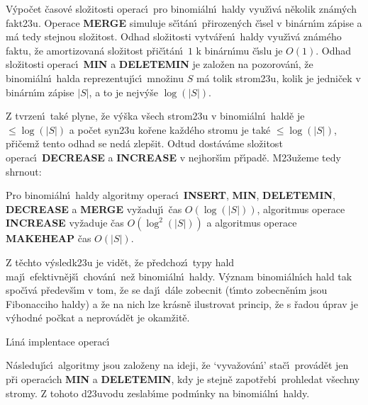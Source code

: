 \documentclass[a4paper,12pt]{article}
\begin{document}
\flushpar V\'ypo\v cet \v casov\'e slo\v zitosti operac\'\i\ pro binomi\'aln\'\i\ haldy 
vyu\v z\'\i v\'a n\v ekolik zn\'am\'ych fakt\accent23u.  Ope\-race {\bf MERGE }
simuluje s\v c\'\i t\'an\'\i\ p\v rirozen\'ych \v c\'\i sel v bin\'arn\'\i m z\'apise a m\'a 
tedy stejnou slo\v zitost.  Odhad slo\v zitosti vytv\'a\v ren\'\i\ haldy vyu\v z\'\i v\'a 
zn\'am\'eho faktu, \v ze amortizovan\'a slo\v zitost p\v ri\v c\'\i t\'an\'\i\ $
1$  
k bin\'arn\'\i mu \v c\'\i slu je $O(1)$.  
Odhad slo\v zitosti operac\'\i\ {\bf MIN} a {\bf DELETEMIN} je zalo\v zen na 
pozorov\'an\'\i , \v ze binomi\'aln\'\i\ halda reprezentuj\'\i c\'\i\ mno\v zinu $
S$ m\'a 
tolik strom\accent23u, kolik je jedni\v cek v bin\'arn\'\i m z\'apise $
|S|$, a 
to je nejv\'y\v se $\log(|S|)$.  
\medskip

\flushpar Z tvrzen\'\i\ tak\'e plyne, \v ze v\'y\v ska v\v sech strom\accent23u v 
binomi\'aln\'\i\ hald\v e je $\le\log(|S|)$ a po\v cet syn\accent23u 
ko\v rene ka\v zd\'eho stromu je 
tak\'e $\le\log(|S|)$, p\v ri\v cem\v z tento odhad se ned\'a zlep\v sit. Odtud 
dost\'av\'ame slo\v zitost operac\'\i\ {\bf DECREASE} a {\bf INCREASE} v nejhor\v s\'\i m 
p\v r\'\i pad\v e. M\accent23u\v zeme tedy shrnout:
\medskip


Pro binomi\'aln\'\i\ haldy algoritmy operac\'\i\ 
{\bf IN\-SERT}, {\bf MIN}, {\bf DELETEMIN}, {\bf DECREASE} a {\bf MERGE  }
vy\-\v za\-duj\'\i\ \v cas $O(\log(|S|))$, algoritmus operace {\bf INCRE\-ASE }
vy\-\v za\-duje \v cas $O(\log^2(|S|))$ a algoritmus operace {\bf MAKEHEAP 
}\v cas $O(|S|)$.
\endproclaim
\medskip


\flushpar Z t\v echto v\'ysledk\accent23u je vid\v et, \v ze p\v redchoz\'\i\ 
typy hald maj\'\i\ efektivn\v ej\v s\'\i\ chov\'an\'\i\ ne\v z binomi\'aln\'\i\ haldy. 
V\'yznam binomi\'aln\'\i ch hald tak spo\-\v c\'\i\-v\'a p\v redev\v s\'\i m v 
tom, \v ze se daj\'\i\ d\'ale zobecnit (t\'\i mto zobecn\v en\'\i m jsou Fibonacciho 
haldy) a \v ze na nich lze kr\'asn\v e 
ilustrovat princip, \v ze s \v radou \'uprav je v\'yhodn\'e po\v ckat 
a neprov\'ad\v et je okam\v zit\v e.
\bigskip

\head
L\'\i n\'a implentace operac\'\i
\endhead

\flushpar N\'asleduj\'\i c\'\i\ algoritmy jsou zalo\v zeny na ideji, \v ze 
`vyva\v zov\'an\'\i ' sta\v c\'\i\ prov\'ad\v et jen p\v ri operac\'\i ch {\bf MIN} a 
{\bf DELETEMIN}, kdy je stejn\v e zapot\v reb\'\i\ prohledat v\v sechny 
stromy. Z tohoto d\accent23uvodu zeslab\'\i me podm\'\i nky na 
binomi\'aln\'\i\ haldy.
\medskip
\end{document}
